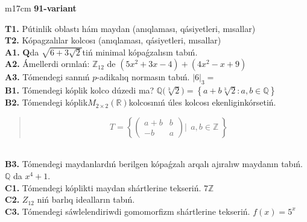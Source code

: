 \documentclass{article}
\begin{document}
\begin{tabular}{m{17cm}}
\textbf{91-variant}
\newline

\textbf{T1.} Pútinlik oblastı hám maydan (anıqlaması, qásiyetleri, mısallar) \\
\textbf{T2.} Kópagzalılar kolcosı (anıqlaması, qásiyetleri, mısallar) \\
\textbf{A1.} \(\mathbf{Q}\)da \(\sqrt{6 + 3\sqrt{2}}\)tiń minimal kópaǵzalısın tabıń. \\
\textbf{A2.} Ámellerdi orınlań: \(\mathbb{Z}_{12}\) de \(\left( 5x^{2} + 3x - 4 \right) + \left( 4x^{2} - x + 9 \right)\) \\
\textbf{A3.} Tómendegi sannıń \(p\)-adikalıq normasın tabıń. \(|6|_{3} =\) \\
\textbf{B1.} Tómendegi kóplik kolco dúzedi ma? \(\mathbb{Q(}\sqrt[3]{2}) = \left\{ a + b\sqrt[3]{2}:a,b \in \mathbb{Q} \right\}\) \\
\textbf{B2.} Tómendegi kóplik\(M_{2 \times 2}\left( \mathbb{R} \right)\)kolcosınıń úles kolcosı ekenliginkórsetiń.
\begin{quote}
\[T = \left\{ \begin{pmatrix}
a + b & b \\
 - b & a
\end{pmatrix}\left| \ \ a,b\mathbb{\in Z} \right.\  \right\}\]
\end{quote} \\
\textbf{B3.} Tómendegi maydanlardıń berilgen kópaǵzalı arqalı ajıralıw maydanın tabıń. \(\mathbb{Q}\) da \(x^{4} + 1\). \\
\textbf{C1.} Tómendegi kóplikti maydan shártlerine tekseriń. \(7\mathbb{Z}\) \\
\textbf{C2.} \(Z_{12}\) niń barlıq idealların tabıń. \\
\textbf{C3.} Tómendegi sáwlelendiriwdi gomomorfizm shártlerine tekseriń. \(f(x) = 5^{x}\) \\

\end{tabular}
\vspace{1cm}
\end{document}

